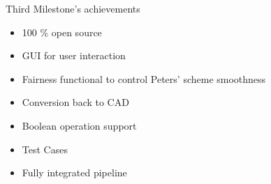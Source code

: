 \begin{frame}{Third Milestone's achievements}



\begin{itemize}
	
	\item[\textcolor{green}
	{\Checkmark}] 100 \% open source
	
	\item[\textcolor{green}
	{\Checkmark}] GUI for user interaction
	
	\item[\textcolor{green}
	{\Checkmark}] Fairness functional to control Peters' scheme smoothness
	
		\item[\textcolor{green}
	{\Checkmark}] Conversion back to CAD
	
	\item[\textcolor{green}
	{\Checkmark}] Boolean operation support
	
	\item[\textcolor{green}
	{\Checkmark}] Test Cases
	
	\item[\textcolor{green}{\Checkmark}] Fully integrated pipeline 


\end{itemize}

\end{frame}


